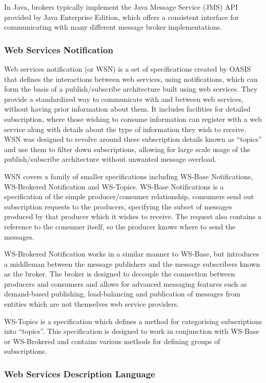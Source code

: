 \documentclass[a4paper, 12pt]{article}
\begin{document}
In Java, brokers typically implement the Java Message Service (JMS) API provided by Java Enterprise Edition, which offers a consistent interface for communicating with many different message broker implementations.

\subsubsection{Web Services Notification}

Web services notification (or WSN) is a set of specifications created by OASIS that defines the interactions between web services, using notifications, which can form the basis of a publish/subscribe architecture built using web services. They provide a standardized way to communicate with and between web services, without having prior information about them. It includes facilities for detailed subscription, where those wishing to consume information can register with a web service along with details about the type of information they wish to receive. WSN was designed to revolve around these subscription details known as ``topics'' and use them to filter down subscriptions, allowing for large scale usage of the publish/subscribe architecture without unwanted message overload.

WSN covers a family of smaller specifications including WS-Base Notifications, WS-Brokered Notification and WS-Topics. WS-Base Notifications is a specification of the simple producer/consumer relationship, consumers send out subscription requests to the producers, specifying the subset of messages produced by that producer which it wishes to receive. The request also contains a reference to the consumer itself, so the producer knows where to send the messages.

WS-Brokered Notification works in a similar manner to WS-Base, but introduces a middleman between the message publishers and the message subscribers known as the broker. The broker is designed to decouple the connection between producers and consumers and allows for advanced messaging features such as demand-based publishing, load-balancing and publication of messages from entities which are not themselves web service providers.

WS-Topics is a specification which defines a method for categorising subscriptions into ``topics''. This specification is designed to work in conjunction with WS-Base or WS-Brokered and contains various methods for defining groups of subscriptions.

\subsubsection{Web Services Description Language}
\end{document}
